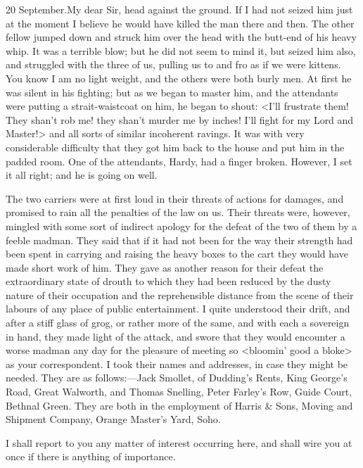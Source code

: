 \begin{mail}{20 September.}{My dear Sir,}
head against the ground. If I had not seized him just at the moment I believe he would have killed the man there and then. The other fellow jumped down and struck him over the head with the butt-end of his heavy whip. It was a terrible blow; but he did not seem to mind it, but seized him also, and struggled with the three of us, pulling us to and fro as if we were kittens. You know I am no light weight, and the others were both burly men. At first he was silent in his fighting; but as we began to master him, and the attendants were putting a strait-waistcoat on him, he began to shout: <I'll frustrate them! They shan't rob me! they shan't murder me by inches! I'll fight for my Lord and Master!> and all sorts of similar incoherent ravings. It was with very considerable difficulty that they got him back to the house and put him in the padded room. One of the attendants, Hardy, had a finger broken. However, I set it all right; and he is going on well.

The two carriers were at first loud in their threats of actions for damages, and promised to rain all the penalties of the law on us. Their threats were, however, mingled with some sort of indirect apology for the defeat of the two of them by a feeble madman. They said that if it had not been for the way their strength had been spent in carrying and raising the heavy boxes to the cart they would have made short work of him. They gave as another reason for their defeat the extraordinary state of drouth to which they had been reduced by the dusty nature of their occupation and the reprehensible distance from the scene of their labours of any place of public entertainment. I quite understood their drift, and after a stiff glass of grog, or rather more of the same, and with each a sovereign in hand, they made light of the attack, and swore that they would encounter a worse madman any day for the pleasure of meeting so <bloomin' good a bloke> as your correspondent. I took their names and addresses, in case they might be needed. They are as follows:—Jack Smollet, of Dudding's Rents, King George's Road, Great Walworth, and Thomas Snelling, Peter Farley's Row, Guide Court, Bethnal Green. They are both in the employment of Harris \& Sons, Moving and Shipment Company, Orange Master's Yard, Soho.

I shall report to you any matter of interest occurring here, and shall wire you at once if there is anything of importance.

\end{mail}


